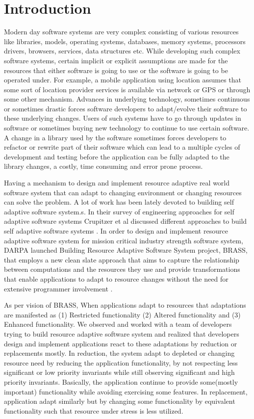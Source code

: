 \section{Introduction}

Modern day software systems are very complex consisting of various resources like libraries, models, operating systems, databases, memory systems, processors drivers, browsers, services, data structures etc. While developing such complex software systems, certain implicit or explicit assumptions are made for the resources that either software is going to use or the software is going to be operated under. For example, a mobile application using location assumes that some sort of location provider services is available via network or GPS or through some other mechanism. Advances in underlying technology, sometimes continuous or sometimes drastic forces software developers to adapt/evolve their software to these underlying changes. Users of such systems have to go through updates in software or sometimes buying new technology to continue to use certain software. A change in a library used by the software sometimes forces developers to refactor or rewrite part of their software which can lead to a multiple cycles of development and testing before the application can be fully adapted to the library changes, a costly, time consuming and error prone process.  

Having a mechanism to design and implement resource adaptive real world software system that can adapt to changing environment or changing resources can solve the problem. A lot of work has been lately devoted to building self adaptive software system.s. In their survey of engineering approaches for self adaptive software systems Crupitzer et al discussed different approaches to build self adaptive software systems \cite{selfAdaptation2}.     
In order to design and implement resource adaptive software system for mission critical industry strength software system, DARPA launched Building Resource Adaptive Software System project, BRASS, that employs a new clean slate approach that aims to capture the relationship between computations and the resources they use and provide transformations that enable applications to adapt to resource changes without the need for extensive programmer involvement \cite{darpa1}. 

As per vision of BRASS, When applications adapt to resources that adaptations are manifested as (1) Restricted functionality (2) Altered functionality and (3) Enhanced functionality. We observed and worked with a team of developers trying to build resource adaptive software system and realized that developers design and implement applications react to these adaptations by reduction or replacements mostly. In reduction, the system adapt to depleted or changing resource need by reducing the application functionality, by not respecting less significant or low priority invariants while still observing significant and high priority invariants. Basically, the application continue to provide some(mostly important) functionality while avoiding exercising some features. In replacement, application adapt similarly but by changing some functionality by equivalent functionality such that resource under stress is less utilized.  

